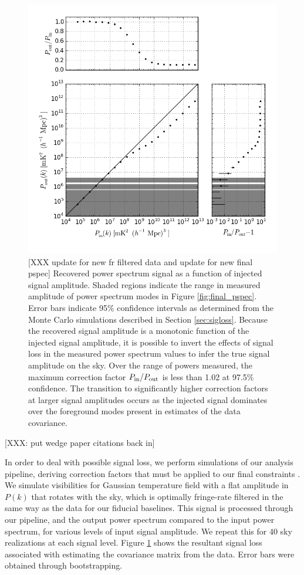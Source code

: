 \documentclass[twocolumn,numberedappendix]{emulateapj} \shorttitle{New Limits on the 21 cm Power Spectrum at $z=8.4$}
\begin{document}
\begin{figure}
\centering
\includegraphics[width=\columnwidth]{plots/sigloss.png}
\caption{
[XXX update for new fr filtered data and update for new final pspec]
Recovered power spectrum signal as a function of injected signal amplitude.  Shaded regions
indicate the range in measured amplitude of power spectrum modes in Figure \ref{fig:final_pspec}.  
Error bars indicate 95\% confidence intervals as determined from the Monte Carlo simulations
described in Section \ref{sec:sigloss}.
Because
the recovered signal amplitude is a monotonic function of the injected signal amplitude,
it is possible to invert the effects of signal loss in the measured power spectrum values
to infer the true signal amplitude on the sky. Over the range of powers measured, the 
maximum correction factor $P_{\rm in}/P_{\rm out}$ is less than 1.02 at 97.5\% confidence.
The transition to significantly higher correction factors at larger signal amplitudes
occurs as the injected signal
dominates over the foreground modes present in estimates of the data covariance.
}\label{fig:signal_loss}
\end{figure}

[XXX: put wedge paper citations back in]

In order to deal with possible signal loss, we perform simulations of our analysis pipeline, 
deriving correction factors that must be applied to our final constraints . We simulate visibilities for
Gaussian temperature field with a flat amplitude in $P(k)$ that rotates with the
sky, which is optimally fringe-rate filtered in the same way as the data for our fiducial baselines. This signal is processed through our pipeline, and the output power spectrum compared to the input
power spectrum, for various levels of input signal amplitude.
We repeat this for 40 sky realizations at each signal level.  Figure
\ref{fig:signal_loss} shows the resultant signal loss associated with
estimating the covariance matrix from the data.  Error bars were obtained
through bootstrapping.
\end{document}
